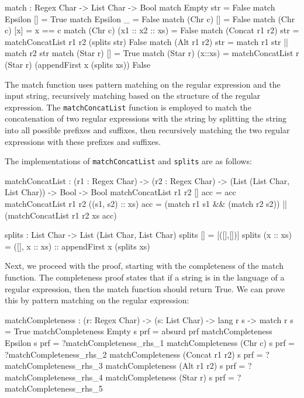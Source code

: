 \documentclass[]{rptuseminar}
\begin{document}
\begin{idris}
match : Regex Char -> List Char -> Bool
match Empty str = False
match Epsilon [] = True
match Epsilon _ = False
match (Chr c) [] = False
match (Chr c) [x] = x == c
match (Chr c) (x1 :: x2 :: xs) = False
match (Concat r1 r2) str =   
    matchConcatList r1 r2 (splits str) False
match (Alt r1 r2) str =   
    match r1 str || match r2 str  
match (Star r) [] = True
match (Star r) (x::xs) =
    matchConcatList r (Star r) (appendFirst x (splits xs)) False 
\end{idris}

The match function uses pattern matching on the regular expression and the input string, recursively matching based on the structure of the regular expression. The \texttt{matchConcatList} function is employed to match the concatenation of two regular expressions with the string by splitting the string into all possible prefixes and suffixes, then recursively matching the two regular expressions with these prefixes and suffixes.

The implementations of \texttt{matchConcatList} and \texttt{splits} are as follows:

\begin{idris}
matchConcatList : (r1 : Regex Char) -> (r2 : Regex Char) -> 
(List (List Char, List Char)) -> Bool -> Bool
matchConcatList r1 r2 [] acc = acc
matchConcatList r1 r2 ((s1, s2) :: xs) acc = 
    (match r1 s1 && (match r2 s2)) || (matchConcatList r1 r2 xs acc)

splits : List Char -> List (List Char, List Char)
splits [] = [([],[])]
splits (x :: xs) = ([], x :: xs) :: appendFirst x (splits xs)
\end{idris}

Next, we proceed with the proof, starting with the completeness of the match function. The completeness proof states that if a string is in the language of a regular expression, then the match function should return True. We can prove this by pattern matching on the regular expression:

\begin{idris}
matchCompleteness : (r: Regex Char) -> (s: List Char) ->
    lang r s -> match r s = True
matchCompleteness Empty s prf = absurd prf
matchCompleteness Epsilon s prf = ?matchCompleteness_rhs_1
matchCompleteness (Chr c) s prf = ?matchCompleteness_rhs_2
matchCompleteness (Concat r1 r2) s prf = ?matchCompleteness_rhs_3
matchCompleteness (Alt r1 r2) s prf = ?matchCompleteness_rhs_4
matchCompleteness (Star r) s prf = ?matchCompleteness_rhs_5
\end{idris}
\end{document}
